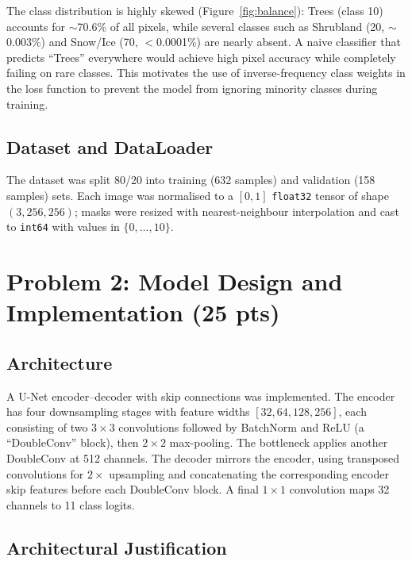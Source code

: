 \documentclass[11pt,letterpaper]{article}
\begin{document}
The class distribution is highly skewed (Figure~\ref{fig:balance}): Trees (class 10) accounts for $\sim$70.6\% of all pixels, while several classes such as Shrubland (20, $\sim$0.003\%) and Snow/Ice (70, $<$0.0001\%) are nearly absent. A naive classifier that predicts ``Trees'' everywhere would achieve high pixel accuracy while completely failing on rare classes. This motivates the use of inverse-frequency class weights in the loss function to prevent the model from ignoring minority classes during training.

\subsection{Dataset and DataLoader}

The dataset was split 80/20 into training (632 samples) and validation (158 samples) sets. Each image was normalised to a $[0,1]$ \texttt{float32} tensor of shape $(3,256,256)$; masks were resized with nearest-neighbour interpolation and cast to \texttt{int64} with values in $\{0,\ldots,10\}$.

\section{Problem 2: Model Design and Implementation (25 pts)}

\subsection{Architecture}

A U-Net encoder--decoder with skip connections was implemented. The encoder has four downsampling stages with feature widths $[32, 64, 128, 256]$, each consisting of two $3\times3$ convolutions followed by BatchNorm and ReLU (a ``DoubleConv'' block), then $2\times2$ max-pooling. The bottleneck applies another DoubleConv at 512 channels. The decoder mirrors the encoder, using transposed convolutions for $2\times$ upsampling and concatenating the corresponding encoder skip features before each DoubleConv block. A final $1\times1$ convolution maps 32 channels to 11 class logits.

\subsection{Architectural Justification}
\end{document}
